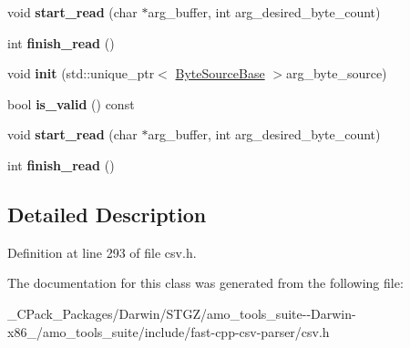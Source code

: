 \begin{DoxyCompactItemize}
void {\bfseries start\+\_\+read} (char $\ast$arg\+\_\+buffer, int arg\+\_\+desired\+\_\+byte\+\_\+count)
\item 
\mbox{\label{classio_1_1detail_1_1_synchronous_reader_a519a0cb25c641d2e51b6542749c44606}} 
int {\bfseries finish\+\_\+read} ()
\item 
\mbox{\label{classio_1_1detail_1_1_synchronous_reader_a4dc78563ff667b92ad3096a94e834eb5}} 
void {\bfseries init} (std\+::unique\+\_\+ptr$<$ \hyperlink{classio_1_1_byte_source_base}{Byte\+Source\+Base} $>$arg\+\_\+byte\+\_\+source)
\item 
\mbox{\label{classio_1_1detail_1_1_synchronous_reader_a9d6b2c888cc7020df1bb81c8bb5c58bc}} 
bool {\bfseries is\+\_\+valid} () const
\item 
\mbox{\label{classio_1_1detail_1_1_synchronous_reader_a6cad1371b97e14f660914898b16433c4}} 
void {\bfseries start\+\_\+read} (char $\ast$arg\+\_\+buffer, int arg\+\_\+desired\+\_\+byte\+\_\+count)
\item 
\mbox{\label{classio_1_1detail_1_1_synchronous_reader_a519a0cb25c641d2e51b6542749c44606}} 
int {\bfseries finish\+\_\+read} ()
\end{DoxyCompactItemize}


\subsection{Detailed Description}


Definition at line 293 of file csv.\+h.



The documentation for this class was generated from the following file\+:\begin{DoxyCompactItemize}
\item 
\+\_\+\+C\+Pack\+\_\+\+Packages/\+Darwin/\+S\+T\+G\+Z/amo\+\_\+tools\+\_\+suite-\/-\/\+Darwin-\/x86\+\_/amo\+\_\+tools\+\_\+suite/include/fast-\/cpp-\/csv-\/parser/csv.\+h\end{DoxyCompactItemize}

